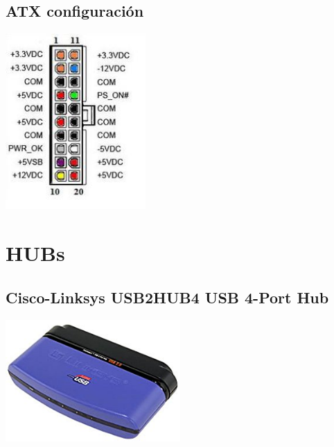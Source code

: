 \documentclass[user_manual.tex]{subfiles}
\begin{document}
%

\subsection{ATX configuración}
\begin{center}
\includegraphics[width=0.4\textwidth]{Figures/Hardware/Partes/ATX.JPG}
\label{fig:Hardware:Partes:Microfono:ATX}
\end{center}

\section{HUBs}

\subsection{Cisco-Linksys USB2HUB4 USB 4-Port Hub}

\begin{center}
\includegraphics[width=0.5\textwidth]{Figures/Hardware/Partes/Cisco-Linksys.png}
\label{fig:Hardware:Partes:Cisco}
\end{center}
\end{document}

